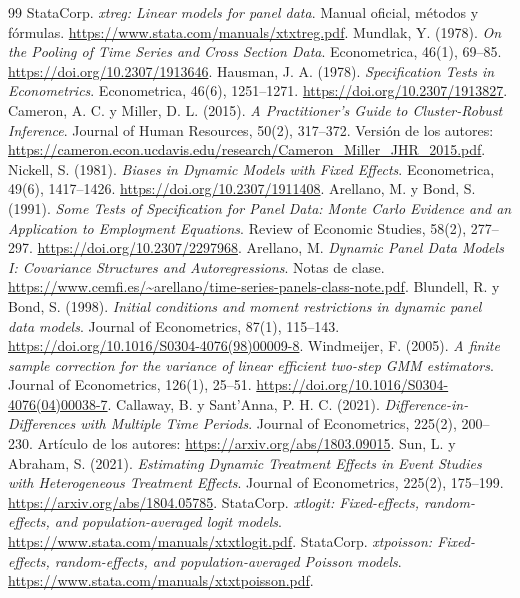\documentclass[11pt,a4paper]{article}
\theoremstyle{definition}
\begin{document}
\begin{thebibliography}{99}
 StataCorp. \textit{xtreg: Linear models for panel data}. Manual oficial, métodos y fórmulas. \url{https://www.stata.com/manuals/xtxtreg.pdf}.
 Mundlak, Y. (1978). \textit{On the Pooling of Time Series and Cross Section Data}. Econometrica, 46(1), 69--85. \url{https://doi.org/10.2307/1913646}.
 Hausman, J. A. (1978). \textit{Specification Tests in Econometrics}. Econometrica, 46(6), 1251--1271. \url{https://doi.org/10.2307/1913827}.
 Cameron, A. C. y Miller, D. L. (2015). \textit{A Practitioner's Guide to Cluster-Robust Inference}. Journal of Human Resources, 50(2), 317--372. Versión de los autores: \url{https://cameron.econ.ucdavis.edu/research/Cameron_Miller_JHR_2015.pdf}.
 Nickell, S. (1981). \textit{Biases in Dynamic Models with Fixed Effects}. Econometrica, 49(6), 1417--1426. \url{https://doi.org/10.2307/1911408}.
 Arellano, M. y Bond, S. (1991). \textit{Some Tests of Specification for Panel Data: Monte Carlo Evidence and an Application to Employment Equations}. Review of Economic Studies, 58(2), 277--297. \url{https://doi.org/10.2307/2297968}.
 Arellano, M. \textit{Dynamic Panel Data Models I: Covariance Structures and Autoregressions}. Notas de clase. \url{https://www.cemfi.es/~arellano/time-series-panels-class-note.pdf}.
 Blundell, R. y Bond, S. (1998). \textit{Initial conditions and moment restrictions in dynamic panel data models}. Journal of Econometrics, 87(1), 115--143. \url{https://doi.org/10.1016/S0304-4076(98)00009-8}.
 Windmeijer, F. (2005). \textit{A finite sample correction for the variance of linear efficient two-step GMM estimators}. Journal of Econometrics, 126(1), 25--51. \url{https://doi.org/10.1016/S0304-4076(04)00038-7}.
 Callaway, B. y Sant'Anna, P. H. C. (2021). \textit{Difference-in-Differences with Multiple Time Periods}. Journal of Econometrics, 225(2), 200--230. Artículo de los autores: \url{https://arxiv.org/abs/1803.09015}.
 Sun, L. y Abraham, S. (2021). \textit{Estimating Dynamic Treatment Effects in Event Studies with Heterogeneous Treatment Effects}. Journal of Econometrics, 225(2), 175--199. \url{https://arxiv.org/abs/1804.05785}.
 StataCorp. \textit{xtlogit: Fixed-effects, random-effects, and population-averaged logit models}. \url{https://www.stata.com/manuals/xtxtlogit.pdf}.
 StataCorp. \textit{xtpoisson: Fixed-effects, random-effects, and population-averaged Poisson models}. \url{https://www.stata.com/manuals/xtxtpoisson.pdf}.
\end{thebibliography}


\label{ultima-pagina}
\end{document}
